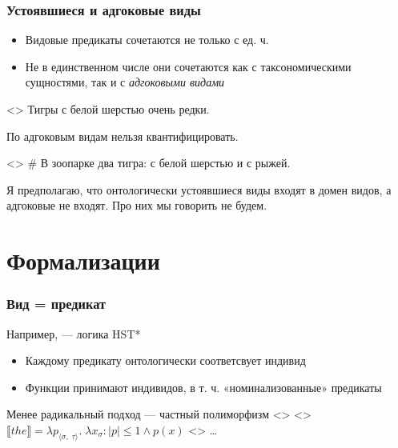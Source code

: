 \documentclass[
    9pt,
]{beamer}
\newcommand{\denote}[1]{\llbracket #1 \rrbracket}
\begin{document}
\begin{frame}
    \frametitle{Устоявшиеся и адгоковые виды}

    \begin{itemize}
        \item Видовые предикаты сочетаются не только с ед. ч.
        \item Не в единственном числе они сочетаются как с таксономическими сущностями, так и с \textit{адгоковыми видами} \parencite{mendia2019referenceadhoc}
    \end{itemize}
    
    \ex<>
        Тигры с белой шерстью очень редки.
    \xe

    По адгоковым видам нельзя квантифицировать.
    
    \ex<>
        \ljudge\# В зоопарке два тигра: с белой шерстью и с рыжей.
    \xe

    Я предполагаю, что онтологически устоявшиеся виды входят в домен видов, а адгоковые не входят. Про них мы говорить не будем.

\end{frame}


\section{Формализации}

\begin{frame}
    \frametitle{Вид = предикат}

    Например, \parencite{cocchiarella1974fregeansemanticsrealist,chierchia1984topicssyntaxsemantics} — логика HST*
    \begin{itemize}
        \item Каждому предикату онтологически соответсвует индивид
        \item Функции принимают индивидов, в т. ч. «номинализованные» предикаты
    \end{itemize}

    Менее радикальный подход — частный полиморфизм
    \pex<>
        \a<> $\denote{the} = \lambda p_{\langle\sigma,\; \tau\rangle}.\; \lambda x_\sigma: |p|\le 1 \land p(x)$
        \a<> \dots
    \xe

\end{frame}
\end{document}
